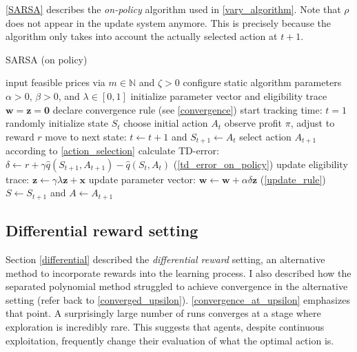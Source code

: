 \autoref{SARSA} describes the \emph{on-policy} algorithm used in \autoref{vary_algorithm}. Note that $\rho$ does not appear in the update system anymore. This is precisely because the algorithm only takes into account the actually selected action at $t+1$.

\begin{algorithm}
	\caption{SARSA (on policy)}
	\begin{algorithmic}[]
		\label{SARSA}
		\small
		\STATE input feasible prices via $m \in \mathbb{N}$ and $\zeta > 0$
		\STATE configure static algorithm parameters $\alpha > 0$, $\beta > 0$, and $\lambda \in [0, 1]$
		\STATE initialize parameter vector and eligibility trace $\boldsymbol{w} = \boldsymbol{z} = \boldsymbol{0}$
		\STATE declare convergence rule (see \autoref{convergence})
		\STATE start tracking time: $t = 1$
		\STATE randomly initialize state $S_t$
		\STATE choose initial action $A_t$
		\STATE observe profit $\pi$, adjust to reward $r$
		\STATE move to next state: $t \leftarrow t+1$ and $S_{t+1} \leftarrow A_t$
		\STATE select action $A_{t+1}$ according to \autoref{action_selection}
		\STATE calculate TD-error: $\delta \leftarrow r + \gamma \hat{q}(S_{t+1}, A_{t+1}) - \hat{q}(S_t, A_t)$ (\autoref{td_error_on_policy})
		\STATE update eligibility trace: $\boldsymbol{z} \leftarrow \gamma \lambda \boldsymbol{z} + \boldsymbol{x}$
		\STATE update parameter vector: $\boldsymbol{w} \leftarrow \boldsymbol{w} + \alpha  \delta  \boldsymbol{z}$ (\autoref{update_rule})
		\STATE $S \leftarrow S_{t+1}$ and $A \leftarrow A_{t+1}$
		\ENDWHILE
	\end{algorithmic}
\end{algorithm}

\clearpage

\subsection{Differential reward setting}\label{differential_appendix}

Section \ref{differential} described the \emph{differential reward} setting, an alternative method to incorporate rewards into the learning process. I also described how the separated polynomial method struggled to achieve convergence in the alternative setting (refer back to \autoref{converged_upsilon}). \autoref{convergence_at_upsilon} emphasizes that point. A surprisingly large number of runs converges at a stage where exploration is incredibly rare. This suggests that agents, despite continuous exploitation, frequently change their evaluation of what the optimal action is.

